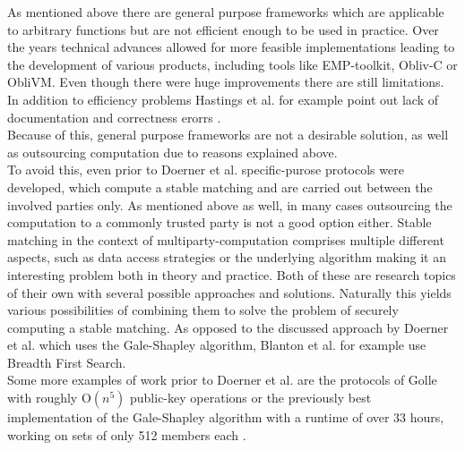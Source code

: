 As mentioned above there are general purpose frameworks which are applicable to arbitrary functions but are not efficient enough to be used in practice. Over the years technical advances allowed for more feasible implementations leading to the development of various products, including tools like EMP-toolkit, Obliv-C or ObliVM. Even though there were huge improvements there are still limitations. In addition to efficiency problems Hastings et al.  for example point out lack of documentation and correctness erorrs . \\
Because of this, general purpose frameworks are not a desirable solution, as well as outsourcing computation due to reasons explained above.\\
To avoid this, even prior to Doerner et al.  specific-purose protocols were developed, which compute a stable matching and are carried out between the involved parties only. As mentioned above as well, in many cases outsourcing the computation to a commonly trusted party is not a good option either. Stable matching in the context of multiparty-computation comprises multiple different aspects, such as data access strategies or the underlying algorithm making it an interesting problem both in theory and practice. Both of these are research topics of their own with several possible approaches and solutions. Naturally this yields various possibilities of combining them to solve the problem of securely computing a stable matching. As opposed to the discussed approach by Doerner et al.  which uses the Gale-Shapley algorithm, Blanton et al.  for example use Breadth First Search. \\
Some more examples of work prior to Doerner et al.  are the protocols of Golle  with roughly O$(n^5)$ public-key operations  or the previously best implementation of the Gale-Shapley algorithm with a runtime of over 33 hours, working on sets of only 512 members each .